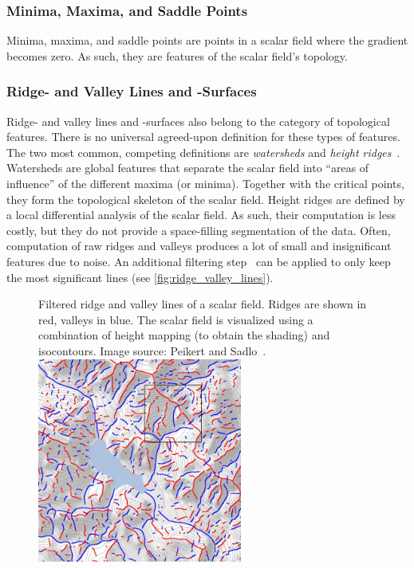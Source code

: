%
\subsubsection{Minima, Maxima, and Saddle Points}
%
Minima, maxima, and saddle points are points in a scalar field where
the gradient becomes zero.
%
As such, they are features of the scalar field's topology.
%
%

%
\subsubsection{Ridge- and Valley Lines and -Surfaces}
%
Ridge- and valley lines and -surfaces also belong to the category
of topological features.
%
There is no universal agreed-upon definition for these types of features.
%
The two most common, competing definitions are \emph{watersheds} and
\emph{height ridges}~\cite{Peikert2008,Eberly2012}.
%
Watersheds are global features that separate the scalar field into ``areas of
influence'' of the different maxima (or minima).
%
Together with the critical points, they form the topological skeleton of the
scalar field.
%
Height ridges are defined by a local differential analysis of the scalar field.
%
As such, their computation is less costly, but they do not provide a
space-filling segmentation of the data.
%
Often, computation of raw ridges and valleys produces a lot of small and
insignificant features due to noise.
%
An additional filtering step~\cite{Peikert2008} can be applied to only keep the most significant
lines (see \autoref{fig:ridge_valley_lines}).
%
\begin{figure}[t]
    \begin{captionbeside}
        {Filtered ridge and valley lines of a scalar field.
        Ridges are shown in red, valleys in blue. The scalar field is visualized
        using a combination of height mapping (to obtain the shading) and
        isocontours. Image source: Peikert and Sadlo~\cite{Peikert2008}.}
        \includegraphics[width=0.6\textwidth]{figures/ridge_valley_lines_peikert.jpg}
    \end{captionbeside}
    \label{fig:ridge_valley_lines}
\end{figure}
